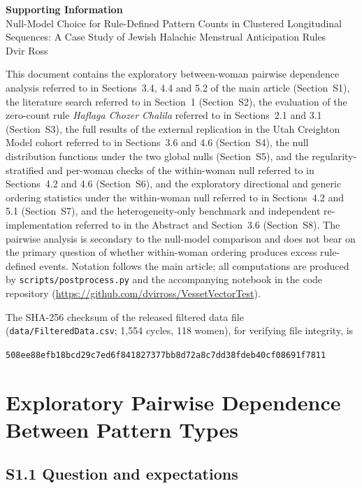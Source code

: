 \documentclass[12pt]{article}
\begin{document}
\begin{center}
{\large\bfseries Supporting Information}\\[6pt]
{\normalsize Null-Model Choice for Rule-Defined Pattern Counts in Clustered Longitudinal
Sequences: A Case Study of Jewish Halachic Menstrual Anticipation Rules}\\[4pt]
{\normalsize Dvir Ross}
\end{center}

\bigskip
\noindent This document contains the exploratory between-woman pairwise dependence
analysis referred to in Sections~3.4, 4.4 and 5.2 of the main article (Section~S1), the
literature search referred to in Section~1 (Section~S2), the evaluation of the
zero-count rule \textit{Haflaga Chozer Chalila} referred to in Sections~2.1 and 3.1
(Section~S3), the full results of the external replication in the Utah Creighton Model
cohort referred to in Sections~3.6 and 4.6 (Section~S4), the null distribution
functions under the two global nulls (Section~S5), and the regularity-stratified and
per-woman checks of the within-woman null referred to in Sections~4.2 and 4.6
(Section~S6), and the exploratory directional and generic ordering statistics under the
within-woman null referred to in Sections~4.2 and 5.1 (Section~S7), and the
heterogeneity-only benchmark and independent re-implementation referred to in the Abstract
and Section~3.6 (Section~S8). The pairwise analysis is
secondary to the null-model comparison and does not bear on the primary question of
whether within-woman ordering produces excess rule-defined events. Notation follows the
main article; all computations are produced by \texttt{scripts/postprocess.py} and the
accompanying notebook in the code repository
(\url{https://github.com/dvirross/VessetVectorTest}).

\medskip
\noindent The SHA-256 checksum of the released filtered data file
(\nolinkurl{data/FilteredData.csv}; 1,554 cycles, 118 women), for verifying file
integrity, is
\begin{center}
\small\texttt{508ee88efb18bcd29c7ed6f841827377bb8d72a8c7dd38fdeb40cf08691f7811}
\end{center}

\section{Exploratory Pairwise Dependence Between Pattern Types}
\label{sec:si-pairwise}

\subsection*{S1.1 Question and expectations}
\end{document}
